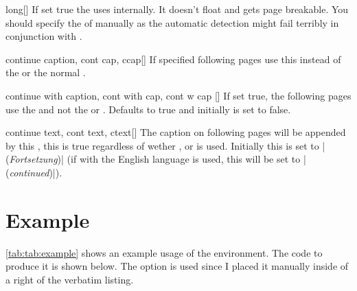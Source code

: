 \begin{describeopt}{long}[]%
  If set true the  uses  internally. It doesn't
  float and gets page breakable. You should specify the  of
   manually as the automatic detection might fail terribly in
  conjunction with .
\end{describeopt}%
\begin{describeopt}{continue caption, cont cap, ccap}[]%
  If specified following pages use this  instead of the  or the normal .
\end{describeopt}%
\begin{describeopt}{continue with caption, cont with cap, cont w cap}%
  []
  If set true, the following pages use the  and not the  or . Defaults to true and initially is set to
  false.
\end{describeopt}%
\begin{describeopt}{continue text, cont text, ctext}[]%
  The caption on following pages will be appended by this , this is
  true regardless of wether ,  or  is used. Initially this is set to \bverb|(\emph{Fortsetzung})| (if
   with the English language is used, this will be set to
  \bverb|(\emph{continued})|).
\end{describeopt}%

\section{Example}\label{sec:tab:example}
\autoref{tab:tab:example} shows an example usage of the 
environment. The code to produce it is shown below. The  option is
used since I placed it manually inside of a  right of the verbatim
listing.

